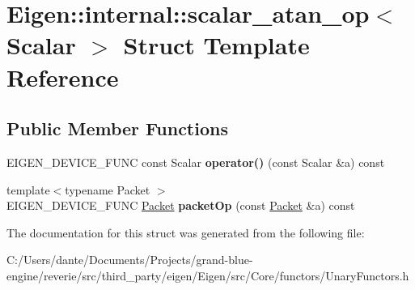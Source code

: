 \hypertarget{struct_eigen_1_1internal_1_1scalar__atan__op}{}\section{Eigen\+::internal\+::scalar\+\_\+atan\+\_\+op$<$ Scalar $>$ Struct Template Reference}
\label{struct_eigen_1_1internal_1_1scalar__atan__op}
\subsection*{Public Member Functions}
\begin{DoxyCompactItemize}
\item 
\mbox{\label{struct_eigen_1_1internal_1_1scalar__atan__op_a04ef6093fea73bc9fdb084deb43212dd}} 
E\+I\+G\+E\+N\+\_\+\+D\+E\+V\+I\+C\+E\+\_\+\+F\+U\+NC const Scalar {\bfseries operator()} (const Scalar \&a) const
\item 
\mbox{\label{struct_eigen_1_1internal_1_1scalar__atan__op_aa58f970745f7b563a6c9ce9f999ec008}} 
{\footnotesize template$<$typename Packet $>$ }\\E\+I\+G\+E\+N\+\_\+\+D\+E\+V\+I\+C\+E\+\_\+\+F\+U\+NC \mbox{\hyperlink{union_eigen_1_1internal_1_1_packet}{Packet}} {\bfseries packet\+Op} (const \mbox{\hyperlink{union_eigen_1_1internal_1_1_packet}{Packet}} \&a) const
\end{DoxyCompactItemize}


The documentation for this struct was generated from the following file\+:\begin{DoxyCompactItemize}
\item 
C\+:/\+Users/dante/\+Documents/\+Projects/grand-\/blue-\/engine/reverie/src/third\+\_\+party/eigen/\+Eigen/src/\+Core/functors/Unary\+Functors.\+h\end{DoxyCompactItemize}
